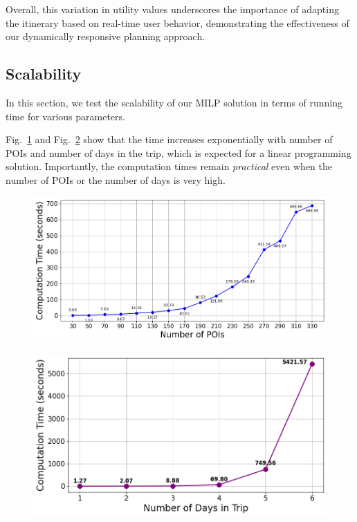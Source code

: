 Overall, this variation in utility values underscores the importance of adapting the itinerary based on real-time user behavior, demonstrating the effectiveness of our dynamically responsive planning approach.

\subsection{Scalability}

In this section, we test the scalability of our MILP solution in terms of running time for various parameters.

Fig.~\ref{fig:number-of-pois} and Fig.~\ref{fig:number-of-days} show that the time increases exponentially with number of POIs and number of days in the trip, which is expected for a linear programming solution.
Importantly, the computation times remain \emph{practical} even when the number of POIs or the number of days is very high.

\begin{figure}[t]
    \centering
    \includegraphics[width=\figwidth]{plots/scalability_new_pkj.png}
    \label{fig:number-of-pois}
\end{figure}

\begin{figure}[t]
    \centering
\includegraphics[width=\figwidth]{plots/scalability_multiday.png}
    \label{fig:number-of-days}
\end{figure}

